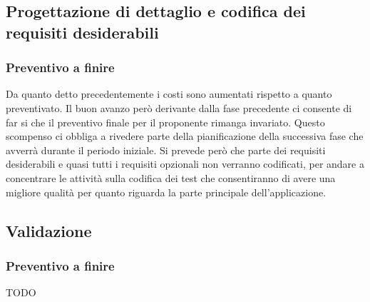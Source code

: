 		\subsection{Progettazione di dettaglio e codifica dei requisiti desiderabili} %

			\subsubsection{Preventivo a finire} %
			Da quanto detto precedentemente i costi sono aumentati rispetto a quanto preventivato. Il buon avanzo però derivante dalla fase precedente ci consente di far si che il preventivo finale per il proponente rimanga invariato.
			Questo scompenso ci obbliga a rivedere parte della pianificazione della successiva fase che avverrà durante il periodo iniziale. \newline
			Si prevede però che parte dei requisiti desiderabili e quasi tutti i requisiti opzionali non verranno codificati, per andare a concentrare le attività sulla codifica dei test che consentiranno di avere una migliore qualità per quanto riguarda la parte principale dell'applicazione.


		\subsection{Validazione} %

			\subsubsection{Preventivo a finire} %
			TODO

